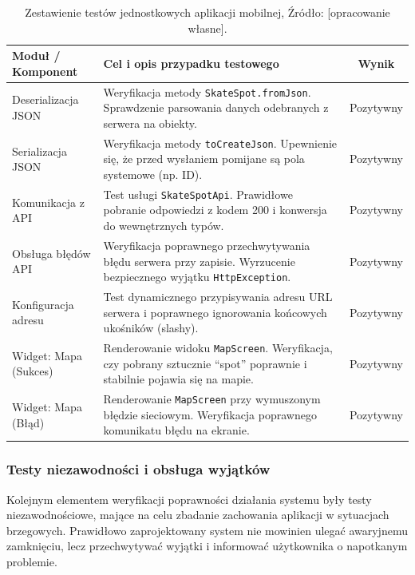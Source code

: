        \begin{table}[!ht] \centering
            \caption{Zestawienie testów jednostkowych aplikacji mobilnej, Źródło: [opracowanie własne].}
            \label{tab:flutter_cases}
            \begin{tabularx}{\textwidth}{ | l | X | c | } \hline
                \textbf{Moduł / Komponent} & \textbf{Cel i opis przypadku testowego} & \textbf{Wynik} \\ \hline
                Deserializacja JSON & Weryfikacja metody \texttt{SkateSpot.fromJson}. Sprawdzenie parsowania danych odebranych z serwera na obiekty. & Pozytywny \\ \hline
                Serializacja JSON & Weryfikacja metody \texttt{toCreateJson}. Upewnienie się, że przed wysłaniem pomijane są pola systemowe (np. ID). & Pozytywny \\ \hline
                Komunikacja z API & Test usługi \texttt{SkateSpotApi}. Prawidłowe pobranie odpowiedzi z kodem 200 i konwersja do wewnętrznych typów. & Pozytywny \\ \hline
                Obsługa błędów API & Weryfikacja poprawnego przechwytywania błędu serwera przy zapisie. Wyrzucenie bezpiecznego wyjątku \texttt{HttpException}. & Pozytywny \\ \hline
                Konfiguracja adresu & Test dynamicznego przypisywania adresu URL serwera i poprawnego ignorowania końcowych ukośników (slashy). & Pozytywny \\ \hline
                Widget: Mapa (Sukces) & Renderowanie widoku \texttt{MapScreen}. Weryfikacja, czy pobrany sztucznie \enquote{spot} poprawnie i stabilnie pojawia się na mapie. & Pozytywny \\ \hline
                Widget: Mapa (Błąd) & Renderowanie \texttt{MapScreen} przy wymuszonym błędzie sieciowym. Weryfikacja poprawnego komunikatu błędu na ekranie. & Pozytywny \\ \hline
            \end{tabularx}
        \end{table}

            \subsubsection{Testy niezawodności i obsługa wyjątków}

                Kolejnym elementem weryfikacji poprawności działania systemu były testy niezawodnościowe, mające na celu zbadanie zachowania aplikacji w sytuacjach brzegowych. Prawidłowo zaprojektowany system nie mowinien ulegać awaryjnemu zamknięciu, lecz przechwytywać wyjątki i informować użytkownika o napotkanym problemie. 

